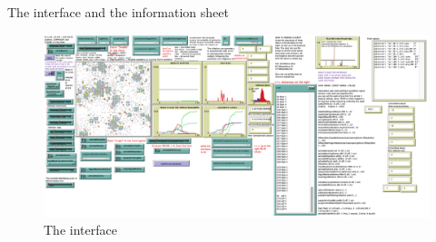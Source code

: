 \documentclass[8pt]{beamer}
\begin{document}
\begin{frame}{The interface and the information sheet}

\begin{figure}[H]
\center
\includegraphics[scale=0.14]{interface2021.png}

\caption{The interface} 
\label{interface}
\end{figure}

\end{frame}
\end{document}
